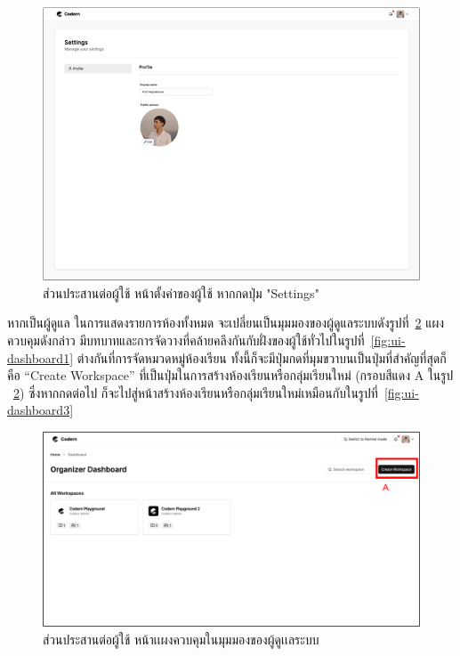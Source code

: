 \documentclass[12pt,one side,openright,a4paper]{cpe-thesis-th}
\newcommand{\thaijustify}[1]{%
  \par\hspace{30pt}\justifying
  #1
}
\begin{document}
    \hypertarget{ui-settings}{
        \begin{figure}[H]
        \centering
            \includegraphics[width=15cm]{figure/ui/ui-settings.png}
            \caption[ส่วนประสานต่อผู้ใช้ หน้าตั้งค่าของผู้ใช้ (กดปุ่ม "Settings")]{ส่วนประสานต่อผู้ใช้ หน้าตั้งค่าของผู้ใช้ หากกดปุ่ม "Settings"}
            \label{fig:ui-settings}
        \end{figure}
    }
    \thaijustify{
        หากเป็นผู้ดูแล ในการแสดงรายการห้องทั้งหมด จะเปลี่ยนเป็นมุมมองของผู้ดูแลระบบดังรูปที่~\ref{fig:ui-org-dashboard1} แผงควบคุมดังกล่าว มีบทบาทและการจัดวางที่คล้ายคลึงกันกับฝั่งของผู้ใช้ทั่วไปในรูปที่~\ref{fig:ui-dashboard1} ต่างกันที่การจัดหมวดหมู่ห้องเรียน ทั้งนี้ก็จะมีปุ่มกดที่มุมขวาบนเป็นปุ่มที่สำคัญที่สุดก็คือ “Create Workspace” ที่เป็นปุ่มในการสร้างห้องเรียนหรือกลุ่มเรียนใหม่ (กรอบสีแดง A ในรูป ~\ref{fig:ui-org-dashboard1}) ซึ่งหากกดต่อไป ก็จะไปสู่หน้าสร้างห้องเรียนหรือกลุ่มเรียนใหม่เหมือนกับในรูปที่~\ref{fig:ui-dashboard3}
    }
    \hypertarget{ui-org-dashboard1}{
        \begin{figure}[H]
        \centering
            \includegraphics[width=15cm]{figure/ui/ui-org-dashboard1.png}
            \caption[ส่วนประสานต่อผู้ใช้ หน้าแผงควบคุม ในมุมมองของผู้ดูแลระบบ]{ส่วนประสานต่อผู้ใช้ หน้าเเผงควบคุมในมุมมองของผู้ดูเเลระบบ}
            \label{fig:ui-org-dashboard1}
        \end{figure}
    }
\end{document}
